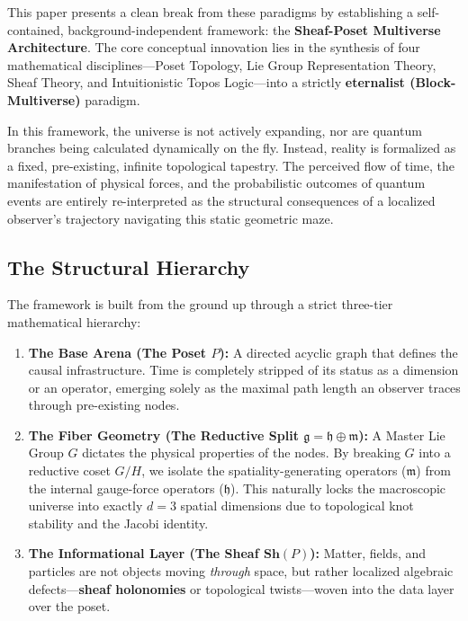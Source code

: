 \documentclass[12pt,letterpaper]{article}
\begin{document}
This paper presents a clean break from these paradigms by establishing a self-contained, background-independent framework: the \textbf{Sheaf-Poset Multiverse Architecture}. The core conceptual innovation lies in the synthesis of four mathematical disciplines---Poset Topology, Lie Group Representation Theory, Sheaf Theory, and Intuitionistic Topos Logic---into a strictly \textbf{eternalist (Block-Multiverse)} paradigm.

In this framework, the universe is not actively expanding, nor are quantum branches being calculated dynamically on the fly. Instead, reality is formalized as a fixed, pre-existing, infinite topological tapestry. The perceived flow of time, the manifestation of physical forces, and the probabilistic outcomes of quantum events are entirely re-interpreted as the structural consequences of a localized observer's trajectory navigating this static geometric maze.

\subsection{The Structural Hierarchy}
The framework is built from the ground up through a strict three-tier mathematical hierarchy:
\begin{enumerate}
    \item \textbf{The Base Arena (The Poset $P$):} A directed acyclic graph that defines the causal infrastructure. Time is completely stripped of its status as a dimension or an operator, emerging solely as the maximal path length an observer traces through pre-existing nodes.
    \item \textbf{The Fiber Geometry (The Reductive Split $\mathfrak{g} = \mathfrak{h} \oplus \mathfrak{m}$):} A Master Lie Group $G$ dictates the physical properties of the nodes. By breaking $G$ into a reductive coset $G/H$, we isolate the spatiality-generating operators ($\mathfrak{m}$) from the internal gauge-force operators ($\mathfrak{h}$). This naturally locks the macroscopic universe into exactly $d=3$ spatial dimensions due to topological knot stability and the Jacobi identity.
    \item \textbf{The Informational Layer (The Sheaf $\mathbf{Sh}(P)$):} Matter, fields, and particles are not objects moving \textit{through} space, but rather localized algebraic defects---\textbf{sheaf holonomies} or topological twists---woven into the data layer over the poset.
\end{enumerate}
\end{document}
